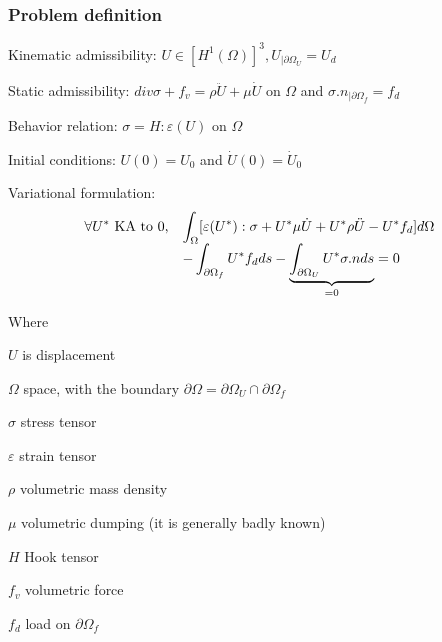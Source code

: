 \documentclass[12pt,a4paper]{article}
\begin{document}
\subsubsection{Problem definition}

\begin{itemize*}
\item Kinematic admissibility:
	$U \in [H^1(\Omega)]^3, U_{|\partial \Omega_U} = U_d $
\item Static admissibility:
	$ div \sigma + f_v = \rho \ddot{U} + \mu \dot{U}$ on $\Omega$ 
		and $\sigma . n _{|\partial \Omega_f} = f_d$
\item Behavior relation:
	$\sigma = H: \varepsilon (U)$ on $ \Omega$
\item Initial conditions:
	$U(0) = U_0$ and $ \dot{U}(0) = \dot{U}_0$
\end{itemize*}

Variational formulation: 
\begin{equation}
	\begin{array}{r l}
	\displaystyle
	\forall U^* ~ \text{KA to 0,} &
	\displaystyle
		\int_\Omega [\varepsilon (U^*): \sigma   
					+ U^* \mu \dot{U} 
					+ U^* \rho \ddot{U}
					- U^* f_d
					] d \Omega	
		\\ &
	\displaystyle
	- \int_{\partial \Omega_f} U^* f_d  ds		
		- \underbrace{
			\int_{\partial \Omega_U} U^* \sigma . n ds	
		  }_{=0}
		= 0
		\end{array}
		\label{VarationalFormulation}
\end{equation}

Where
\begin{itemize*}
\item $U$ is displacement
\item $\Omega$ space, with the boundary $\partial \Omega = \partial \Omega_U \cap \partial \Omega_f$
\item $\sigma$ stress tensor
\item $\varepsilon$ strain tensor
\item $\rho$ volumetric mass density
\item $\mu$ volumetric dumping (it is generally badly known)
\item $H$ Hook tensor
\item $f_v$ volumetric force
\item $f_d$ load on $\partial \Omega_f$
\end{itemize*}
\end{document}
